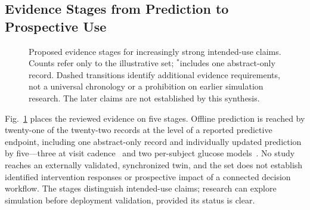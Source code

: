 \documentclass[journal]{IEEEtran}
\begin{document}
\subsection{Evidence Stages from Prediction to Prospective Use}
\label{sec:maturity}
\begin{figure}[t]\centering
{}
\caption{Proposed evidence stages for increasingly strong intended-use claims. Counts refer only to the illustrative set; $^{*}$includes one abstract-only record. Dashed transitions identify additional evidence requirements, not a universal chronology or a prohibition on earlier simulation research. The later claims are not established by this synthesis.}
\label{fig:maturity}\end{figure}
Fig.~\ref{fig:maturity} places the reviewed evidence on five stages. Offline prediction is reached by twenty-one of the twenty-two records at the level of a reported predictive endpoint, including one abstract-only record and individually updated prediction by five---three at visit cadence~\cite{lin2022deep,nitski2021long,glaser2022deep} and two per-subject glucose models~\cite{Li2020GluNet,Lim2025VirtualCGM}. No study reaches an externally validated, synchronized twin, and the set does not establish identified intervention responses or prospective impact of a connected decision workflow. The stages distinguish intended-use claims; research can explore simulation before deployment validation, provided its status is clear.
\end{document}
